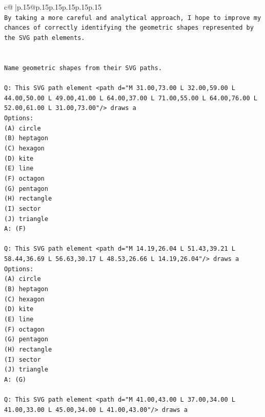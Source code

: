 \documentclass{article}
\begin{document}
{\begin{supertabular}{c@{$\;$}|p{.15\linewidth}@{}p{.15\linewidth}p{.15\linewidth}p{.15\linewidth}p{.15\linewidth}p{.15\linewidth}}
{{{\\ 
\texttt{By taking a more careful and analytical approach, I hope to improve my chances of correctly identifying the geometric shapes represented by the SVG path elements.} \\
\\ 
\\ 
\texttt{Name geometric shapes from their SVG paths.} \\
\\ 
\texttt{Q: This SVG path element <path d="M 31.00,73.00 L 32.00,59.00 L 44.00,50.00 L 49.00,41.00 L 64.00,37.00 L 71.00,55.00 L 64.00,76.00 L 52.00,61.00 L 31.00,73.00"/> draws a} \\
\texttt{Options:} \\
\texttt{(A) circle} \\
\texttt{(B) heptagon} \\
\texttt{(C) hexagon} \\
\texttt{(D) kite} \\
\texttt{(E) line} \\
\texttt{(F) octagon} \\
\texttt{(G) pentagon} \\
\texttt{(H) rectangle} \\
\texttt{(I) sector} \\
\texttt{(J) triangle} \\
\texttt{A: (F)} \\
\\ 
\texttt{Q: This SVG path element <path d="M 14.19,26.04 L 51.43,39.21 L 58.44,36.69 L 56.63,30.17 L 48.53,26.66 L 14.19,26.04"/> draws a} \\
\texttt{Options:} \\
\texttt{(A) circle} \\
\texttt{(B) heptagon} \\
\texttt{(C) hexagon} \\
\texttt{(D) kite} \\
\texttt{(E) line} \\
\texttt{(F) octagon} \\
\texttt{(G) pentagon} \\
\texttt{(H) rectangle} \\
\texttt{(I) sector} \\
\texttt{(J) triangle} \\
\texttt{A: (G)} \\
\\ 
\texttt{Q: This SVG path element <path d="M 41.00,43.00 L 37.00,34.00 L 41.00,33.00 L 45.00,34.00 L 41.00,43.00"/> draws a} \\
}}}
\end{supertabular}}
\end{document}
